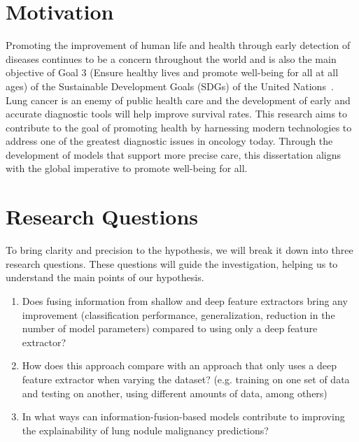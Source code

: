 \section{Motivation} \label{sec:Motivation}

Promoting the improvement of human life and health through early detection of diseases continues to be a concern throughout the world and is also the main objective of Goal 3 (Ensure healthy lives and promote well-being for all at all ages) of the Sustainable Development Goals (SDGs) of the United Nations~\cite{united_nations_17_2015}. Lung cancer is an enemy of public health care and the development of early and accurate diagnostic tools will help improve survival rates.
This research aims to contribute to the goal of promoting health by harnessing modern technologies to address one of the greatest diagnostic issues in oncology today. Through the development of models that support more precise care, this dissertation aligns with the global imperative to promote well-being for all.


\section{Research Questions}
To bring clarity and precision to the hypothesis, we will break it down into three research questions. These questions will guide the investigation, helping us to understand the main points of our hypothesis.

\begin{enumerate}
    \item Does fusing information from shallow and deep feature extractors bring any improvement (classification performance, generalization, reduction in the number of model parameters) compared to using only a deep feature extractor?
    \item How does this approach compare with an approach that only uses a deep feature extractor when varying the dataset? (e.g. training on one set of data and testing on another, using different amounts of data, among others)
    \item In what ways can information-fusion-based models contribute to improving the explainability of lung nodule malignancy predictions?

\end{enumerate}






